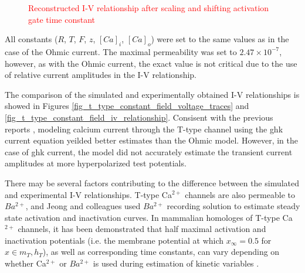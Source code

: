 \documentclass[../main.tex]{subfiles}
\begin{document}
\begin{figure}[!t]
\begin{subfigure}[t]{0.45\textwidth}
        \caption{}
        \label{fig_t_type_constant_field_iv_relationship_scaled}
    \end{subfigure}
    
    \caption{\textcolor{red}{Reconstructed I-V relationship after scaling and shifting activation gate time constant}}
    \label{fig_t_type_voltage_step_ohmic_vs_constant_field_scaled}
\end{figure}

All constants ($R$, $T$, $F$, $z$, $[Ca]_i$, $[Ca]_o$) were set to the same values as in the case of the Ohmic current. The maximal permeability was set to $2.47\times10^{-7}$, however, as with the Ohmic current, the exact value is not critical due to the use of relative current amplitudes in the I-V relationship.

The comparison of the simulated and experimentally obtained I-V relationships is showed in Figures \ref{fig_t_type_constant_field_voltage_traces} and \ref{fig_t_type_constant_field_iv_relationship}. Consisent with the previous reports \parencite{huguenardSimulationCurrentsInvolved1992}, modeling calcium current through the T-type channel using the \gls{ghk} current equation yeilded better estimates than the Ohmic model. However, in the case of \gls{ghk} current, the model did not accurately estimate the transient current amplitudes at more hyperpolarized test potentials.

There may be several factors contributing to the difference between the simulated and experimental I-V relationships. T-type Ca$^{2+}$ channels are also permeable to $Ba^{2+}$, and Jeong and colleagues used $Ba^{2+}$ recording solution to estimate steady state activation and inactivation curves.
In mammalian homologes of T-type Ca$^{2+}$ channels, it has been demonstrated that half maximal activation and inactivation potentials (i.e. the membrane potential at which $x_{\infty}=0.5$ for $x\in {m_T, h_T}$), as well as corresponding time constants, can vary depending on whether Ca$^{2+}$ or $Ba^{2+}$ is used during estimation of kinetic variables \parencite{khanPermeationGatingCaV312008}.
\end{document}
